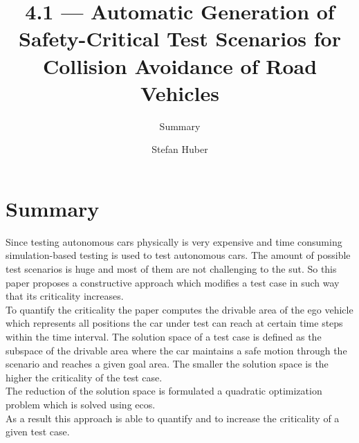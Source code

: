 \documentclass[oneside, notitlepage, twocolumn]{scrartcl}
\title{\LARGE 4.1 --- Automatic Generation of Safety-Critical Test Scenarios for Collision Avoidance of Road Vehicles}
\subtitle{Summary}
\author{Stefan Huber}
\begin{document}
\maketitle

\section{Summary}
Since testing autonomous cars physically is very expensive and time consuming simulation-based testing is used to test autonomous cars.
The amount of possible test scenarios is huge and most of them are not challenging to the \gls{sut}.
So this paper proposes a constructive approach which modifies a test case in such way that its criticality increases.\\
To quantify the criticality the paper computes the drivable area of the ego vehicle which represents all positions the car under test can reach at certain time steps within the time interval.
The solution space of a test case is defined as the subspace of the drivable area where the car maintains a safe motion through the scenario and reaches a given goal area.
The smaller the solution space is the higher the criticality of the test case.\\
The reduction of the solution space is formulated a quadratic optimization problem which is solved using \gls{ecos}.\\
As a result this approach is able to quantify and to increase the criticality of a given test case.
\end{document}
